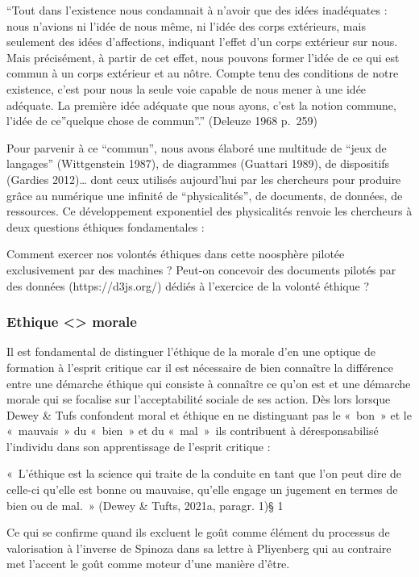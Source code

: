 \documentclass[
  a4paper,
  DIV=11,
  numbers=noendperiod]{scrreprt}
\begin{document}
``Tout dans l'existence nous condamnait à n'avoir que des idées
inadéquates : nous n'avions ni l'idée de nous même, ni l'idée des corps
extérieurs, mais seulement des idées d'affections, indiquant l'effet
d'un corps extérieur sur nous. Mais précisément, à partir de cet effet,
nous pouvons former l'idée de ce qui est commun à un corps extérieur et
au nôtre. Compte tenu des conditions de notre existence, c'est pour nous
la seule voie capable de nous mener à une idée adéquate. La première
idée adéquate que nous ayons, c'est la notion commune, l'idée de
ce''quelque chose de commun''.'' (Deleuze 1968 p.~259)

Pour parvenir à ce ``commun'', nous avons élaboré une multitude de
``jeux de langages'' (Wittgenstein 1987), de diagrammes (Guattari 1989),
de dispositifs (Gardies 2012)\ldots{} dont ceux utilisés aujourd'hui par
les chercheurs pour produire grâce au numérique une infinité de
``physicalités'', de documents, de données, de ressources. Ce
développement exponentiel des physicalités renvoie les chercheurs à deux
questions éthiques fondamentales :

Comment exercer nos volontés éthiques dans cette noosphère pilotée
exclusivement par des machines ? Peut-on concevoir des documents pilotés
par des données (https://d3js.org/) dédiés à l'exercice de la volonté
éthique ?

\subsubsection{Ethique \textless\textgreater{}
morale}\label{ethique-morale}

Il est fondamental de distinguer l'éthique de la morale d'en une optique
de formation à l'esprit critique car il est nécessaire de bien connaître
la différence entre une démarche éthique qui consiste à connaître ce
qu'on est et une démarche morale qui se focalise sur l'acceptabilité
sociale de ses action. Dès lors lorsque Dewey \& Tufs confondent moral
et éthique en ne distinguant pas le «~bon~» et le «~mauvais~» du
«~bien~» et du «~mal~»~ils contribuent à déresponsabilisé l'individu
dans son apprentissage de l'esprit critique :

«~L'éthique est la science qui traite de la conduite en tant que l'on
peut dire de celle-ci qu'elle est bonne ou mauvaise, qu'elle engage un
jugement en termes de bien ou de mal.~» (Dewey \& Tufts, 2021a, paragr.
1)§ 1

Ce qui se confirme quand ils excluent le goût comme élément du processus
de valorisation à l'inverse de Spinoza dans sa lettre à Pliyenberg qui
au contraire met l'accent le goût comme moteur d'une manière d'être.
\end{document}
